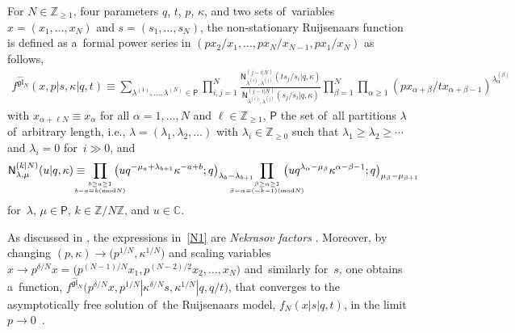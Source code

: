\documentclass[pdftex]{sigma}%
\numberwithin{equation}{section}
\newcommand{\setatop}[2]{\genfrac{}{}{0pt}{}{#1}{#2}}
\newcommand{\C}{{\mathbb C}}
\newcommand{\Z}{{\mathbb Z}}
\begin{document}
\begin{Definition}\label{def1}
For $N\in\Z_{\geq 1}$, four parameters $q$, $t$, $p$, $\kappa$, and two sets of~variables $x=(x_1,\dots,x_N)$ and $s=(s_1,\dots,s_N)$, the non-stationary Ruijsenaars function is defined as a~formal power series in $(px_2/x_1,\dots,px_{N}/x_{N-1},px_1/x_N)$ as follows,
\begin{gather}\label{f1}
f^{\widehat{\mathfrak{gl}}_N}(x,p|s,\kappa|q,t)\equiv \!\!\! \sum_{\lambda^{(1)},\dots,\lambda^{(N)}\in\mathsf{P}} \prod_{i,j=1}^N\frac{\mathsf{N}^{(j-i|N)}_{\lambda^{(i)},\lambda^{(j)}}(ts_j/s_i|q,\kappa)}
{\mathsf{N}^{(j-i|N)}_{\lambda^{(i)},\lambda^{(j)}}(s_j/s_i|q,\kappa)}
\prod_{\beta=1}^N\prod_{\alpha\geq 1}(p x_{\alpha+\beta}/tx_{\alpha+\beta-1})^{\lambda^{(\beta)}_\alpha}\!\!\!
\end{gather}
with $x_{\alpha+\ell N}\equiv x_{\alpha}$ for all $\alpha=1,\dots,N$ and $\ell\in\Z_{\geq 1}$, $\mathsf{P}$ the set of~all partitions $\lambda$ of~arbitrary length, i.e., $\lambda=(\lambda_1,\lambda_2,\dots)$ with $\lambda_i\in\Z_{\geq 0}$ such that $\lambda_1\geq \lambda_2\geq \cdots$ and $\lambda_i=0$ for~$i\gg 0$, and
\begin{gather}
\label{N1}
\mathsf{N}^{(k|N)}_{\lambda,\mu}(u|q,\kappa)\equiv \!\!\!\!\!\!\!\!
\prod_{\setatop{b\geq a\geq 1}{b-a\equiv k(\mathrm{mod}N)}}\!\!\!\!\!\!\!\!
\big(u q^{-\mu_a+\lambda_{b+1}}\kappa^{-a+b};q\big)_{\lambda_{b}-\lambda_{b+1}}
\!\!\!\!\!\!\!\!\!\!\!\!\!\!\!\prod_{\setatop{\beta\geq \alpha\geq 1}{\beta-\alpha\equiv (-k-1)(\mathrm{mod}N)}}\!\!\!\!\!\!\!\!\!\!\!\!\!
\big(uq^{\lambda_\alpha-\mu_\beta}\kappa^{\alpha-\beta-1};q\big)_{\mu_\beta-\mu_{\beta+1}}\!\!\!
\end{gather}
for~$\lambda$, $\mu\in\mathsf{P}$, $k\in\Z/N\Z$, and $u\in\C$.
\end{Definition}

As discussed in \cite{S}, the expressions in~\eqref{N1} are {\em Nekrasov factors} \cite{N}.
Moreover, by chan\-ging $(p,\kappa)\to\big(p^{1/N},\kappa^{1/N}\big)$ and scaling variables $x\to p^{\delta/N}x=\big(p^{(N-1)/N}x_1,p^{(N-2)/2}x_2,\dots,x_N\big)$ and~similarly for~$s$, one obtains a~function, $f^{\widehat{\mathfrak{gl}}_N}\big(p^{\delta/N}x,p^{1/N}|\kappa^{\delta/N} s,\kappa^{1/N}|q,q/t\big)$, that converges to the asymptotically free solution of~the Ruijsenaars model, $f_N(x|s|q,t)$, in the limit $p\to 0$~\cite{S}.
\end{document}
